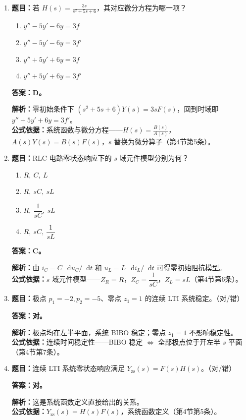 \documentclass[12pt,a4paper]{ctexart}
\newcommand{\dif}{\mathop{}\!\mathrm{d}}
\begin{document}
\begin{enumerate}[label=\arabic*.]
\item \textbf{题目：}若 \(\displaystyle H(s)=\frac{3s}{s^2+5s+6}\)，其对应微分方程为哪一项？
\begin{enumerate}[label=\Alph*.]
\item $y''-5y'-6y=3f$
\item $y''-5y'-6y=3f'$
\item $y''+5y'+6y=3f$
\item $y''+5y'+6y=3f'$
\end{enumerate}
\textbf{答案：D。}\par
\textbf{解析：}零初始条件下 \(\displaystyle (s^2+5s+6)Y(s)=3sF(s)\)，回到时域即 \(\displaystyle y''+5y'+6y=3f'\)。\\
\textbf{公式依据：}系统函数与微分方程——$H(s)=\frac{B(s)}{A(s)}$，$A(s)Y(s)=B(s)F(s)$，$s$ 替换为微分算子（第4节第5条）。

\item \textbf{题目：}RLC 电路零状态响应下的 $s$ 域元件模型分别为何？
\begin{enumerate}[label=\Alph*.]
\item $R,\ C,\ L$
\item $R,\ sC,\ sL$
\item $R,\ \dfrac1{sC},\ sL$
\item $R,\ sC,\ \dfrac1{sL}$
\end{enumerate}
\textbf{答案：C。}\par
\textbf{解析：}由 $i_C=C\,\dif u_C/\dif t$ 和 $u_L=L\,\dif i_L/\dif t$ 可得零初始阻抗模型。\\
\textbf{公式依据：}$s$ 域元件模型——$Z_R=R$，$Z_C=\dfrac1{sC}$，$Z_L=sL$（第4节第6条）。

\item \textbf{题目：}极点 $p_1=-2,p_2=-5$、零点 $z_1=1$ 的连续 LTI 系统稳定。（对/错）\par
\textbf{答案：对。}\par
\textbf{解析：}极点均在左半平面，系统 BIBO 稳定；零点 $z_1=1$ 不影响稳定性。\\
\textbf{公式依据：}连续时间稳定性——BIBO 稳定 $\iff$ 全部极点位于开左半 $s$ 平面（第4节第7条）。

\item \textbf{题目：}连续 LTI 系统零状态响应满足 $Y_{\mathrm{zs}}(s)=F(s)H(s)$。（对/错）\par
\textbf{答案：对。}\par
\textbf{解析：}这是系统函数定义直接给出的关系。\\
\textbf{公式依据：}$Y_{\mathrm{zs}}(s)=H(s)F(s)$，系统函数定义（第4节第5条）。
\end{enumerate}
\end{document}
